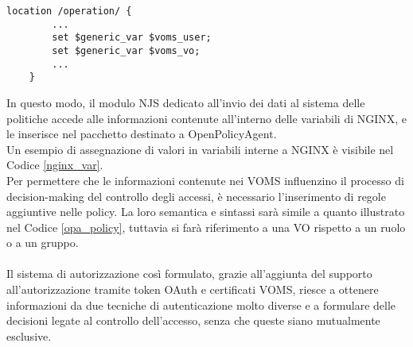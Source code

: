\begin{lstlisting}[caption={[Assegnazione di variabili in NGINX] Assegnazione di valore alle variabili in NGINX, tramite la keyword \texttt{set}.},captionpos=b,label=nginx_var]
    location /operation/ {
        ...
        set $generic_var $voms_user;
        set $generic_var $voms_vo;
        ...
    }
\end{lstlisting}
In questo modo, il modulo NJS 
dedicato all'invio dei dati al sistema delle politiche accede alle informazioni 
contenute all'interno delle variabili di NGINX, 
e le inserisce nel pacchetto destinato a OpenPolicyAgent. 
\\Un esempio di assegnazione di valori in variabili interne a 
NGINX è visibile nel Codice \ref{nginx_var}.
\\ Per permettere che le informazioni contenute nei VOMS influenzino il processo di decision-making del controllo degli accessi,
 è necessario l'inserimento di regole aggiuntive nelle policy. La loro semantica e sintassi sarà simile a quanto illustrato nel Codice \ref*{opa_policy},
tuttavia si farà riferimento a una VO rispetto a un ruolo o a un gruppo.
\\ \\ Il sistema di autorizzazione così formulato, grazie all'aggiunta del supporto all'autorizzazione tramite token OAuth e certificati VOMS, riesce a ottenere informazioni 
da due tecniche di autenticazione molto diverse e a formulare delle decisioni legate al controllo dell'accesso, senza che queste siano mutualmente esclusive. 

